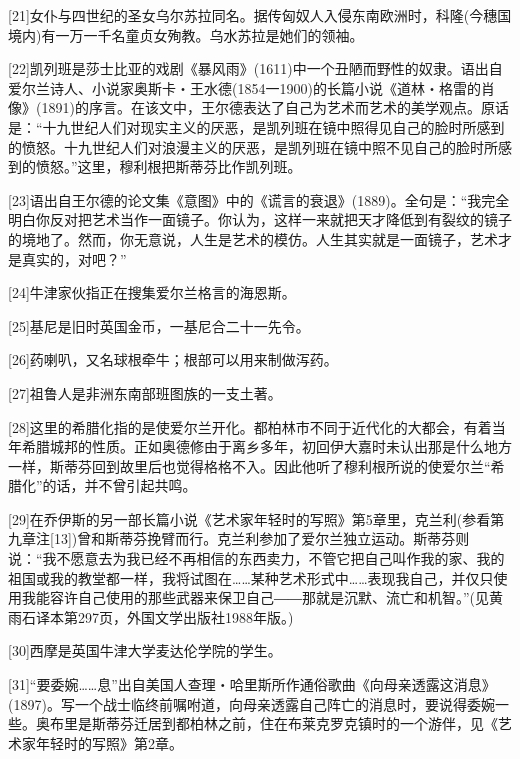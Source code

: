 \documentclass{article}
\begin{document}
[21]女仆与四世纪的圣女乌尔苏拉同名。据传匈奴人入侵东南欧洲时，科隆(今穗国境内)有一万一千名童贞女殉教。乌水苏拉是她们的领袖。



[22]凯列班是莎士比亚的戏剧《暴风雨》(1611)中一个丑陋而野性的奴隶。语出自爱尔兰诗人、小说家奥斯卡・王水德(1854一1900)的长篇小说《道林・格雷的肖像》(1891)的序言。在该文中，王尔德表达了自己为艺术而艺术的美学观点。原话是：“十九世纪人们对现实主义的厌恶，是凯列班在镜中照得见自己的脸时所感到的愤怒。十九世纪人们对浪漫主义的厌恶，是凯列班在镜中照不见自己的脸时所感到的愤怒。”这里，穆利根把斯蒂芬比作凯列班。



[23]语出自王尔德的论文集《意图》中的《谎言的衰退》(1889)。全句是：“我完全明白你反对把艺术当作一面镜子。你认为，这样一来就把天才降低到有裂纹的镜子的境地了。然而，你无意说，人生是艺术的模仿。人生其实就是一面镜子，艺术才是真实的，对吧？”



[24]牛津家伙指正在搜集爱尔兰格言的海恩斯。



[25]基尼是旧时英国金币，一基尼合二十一先令。



[26]药喇叭，又名球根牵牛；根部可以用来制做泻药。



[27]祖鲁人是非洲东南部班图族的一支土著。



[28]这里的希腊化指的是使爱尔兰开化。都柏林市不同于近代化的大都会，有着当年希腊城邦的性质。正如奥德修由于离乡多年，初回伊大嘉时未认出那是什么地方一样，斯蒂芬回到故里后也觉得格格不入。因此他听了穆利根所说的使爱尔兰“希腊化”的话，并不曾引起共鸣。



[29]在乔伊斯的另一部长篇小说《艺术家年轻时的写照》第5章里，克兰利(参看第九章注[13])曾和斯蒂芬挽臂而行。克兰利参加了爱尔兰独立运动。斯蒂芬则说：“我不愿意去为我已经不再相信的东西卖力，不管它把自己叫作我的家、我的祖国或我的教堂都一样，我将试图在……某种艺术形式中……表现我自己，并仅只使用我能容许自己使用的那些武器来保卫自己――那就是沉默、流亡和机智。”(见黄雨石译本第297页，外国文学出版社1988年版。)



[30]西摩是英国牛津大学麦达伦学院的学生。



[31]“要委婉……息”出自美国人查理・哈里斯所作通俗歌曲《向母亲透露这消息》(1897)。写一个战士临终前嘱咐道，向母亲透露自己阵亡的消息时，要说得委婉一些。奥布里是斯蒂芬迁居到都柏林之前，住在布莱克罗克镇时的一个游伴，见《艺术家年轻时的写照》第2章。
\end{document}
